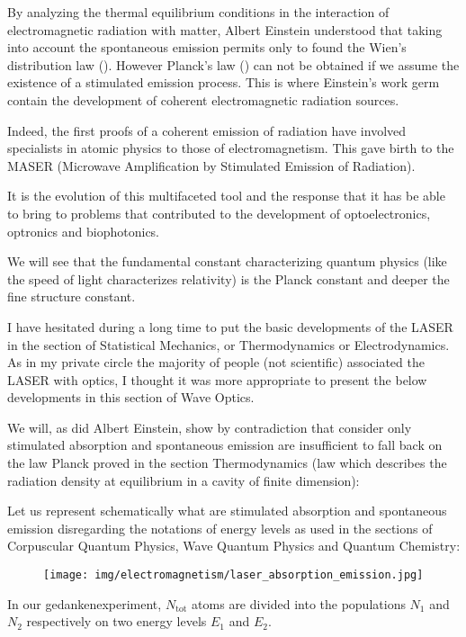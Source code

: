 	By analyzing the thermal equilibrium conditions in the interaction of electromagnetic radiation with matter, Albert Einstein understood that taking into account the spontaneous emission permits only to found the Wien's distribution law (). However Planck's law () can not be obtained if we assume the existence of a stimulated emission process. This is where Einstein's work germ contain the development of coherent electromagnetic radiation sources.

	Indeed, the first proofs of a coherent emission of radiation have involved specialists in atomic physics to those of electromagnetism. This gave birth to the MASER (Microwave Amplification by Stimulated Emission of Radiation).

	It is the evolution of this multifaceted tool and the response that it has be able to bring to problems that contributed to the development of optoelectronics, optronics and biophotonics.
	
	\begin{tcolorbox}[title=Remark,colframe=black,arc=10pt]
	We will see that the fundamental constant characterizing quantum physics (like the speed of light characterizes relativity) is the Planck constant and deeper the fine structure constant.
	\end{tcolorbox}
	I have hesitated during a long time to put the basic developments of the LASER in the section of Statistical Mechanics, or Thermodynamics or Electrodynamics. As in my private circle the majority of people (not scientific) associated the LASER with optics, I thought it was more appropriate to present the below developments in this section of Wave Optics.
	
	We will, as did Albert Einstein, show by contradiction that consider only stimulated absorption and spontaneous emission are insufficient to fall back on the law Planck proved in the section Thermodynamics (law which describes the radiation density at equilibrium in a cavity of finite dimension):
	
	Let us represent schematically what are stimulated absorption and spontaneous emission disregarding the notations of energy levels as used in the sections of Corpuscular Quantum Physics, Wave Quantum Physics and Quantum Chemistry:
	\begin{figure}[H]
		\centering
		\texttt{[image: img/electromagnetism/laser\_absorption\_emission.jpg]}
	\end{figure}
	In our gedankenexperiment, $N_\text{tot}$ atoms are divided into the populations $N_1$ and $N_2$ respectively on two energy levels $E_1$ and $E_2$.


